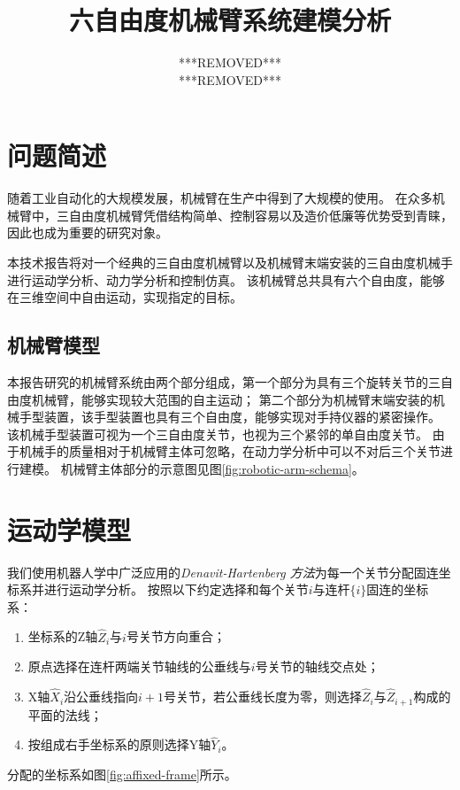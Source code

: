 \documentclass{ctexart}
\title{六自由度机械臂系统建模分析}
\author{***REMOVED*** \\ ***REMOVED***}
\begin{document}
\maketitle

\section{问题简述}

随着工业自动化的大规模发展，机械臂在生产中得到了大规模的使用。
在众多机械臂中，三自由度机械臂凭借结构简单、控制容易以及造价低廉等优势受到青睐，因此也成为重要的研究对象。

本技术报告将对一个经典的三自由度机械臂以及机械臂末端安装的三自由度机械手进行运动学分析、动力学分析和控制仿真。
该机械臂总共具有六个自由度，能够在三维空间中自由运动，实现指定的目标。

\subsection{机械臂模型}



本报告研究的机械臂系统由两个部分组成，第一个部分为具有三个旋转关节的三自由度机械臂，能够实现较大范围的自主运动；
第二个部分为机械臂末端安装的机械手型装置，该手型装置也具有三个自由度，能够实现对手持仪器的紧密操作。
该机械手型装置可视为一个三自由度关节，也视为三个紧邻的单自由度关节。
由于机械手的质量相对于机械臂主体可忽略，在动力学分析中可以不对后三个关节进行建模。
机械臂主体部分的示意图见图\ref{fig:robotic-arm-schema}。

\section{运动学模型}

我们使用机器人学中广泛应用的\emph{Denavit-Hartenberg 方法}为每一个关节分配固连坐标系并进行运动学分析。
按照以下约定选择和每个关节$i$与连杆$\{i\}$固连的坐标系：
\begin{enumerate}
    \item 坐标系的Z轴$\hat Z_i$与$i$号关节方向重合；
    \item 原点选择在连杆两端关节轴线的公垂线与$i$号关节的轴线交点处；
    \item X轴$\hat X_i$沿公垂线指向$i+1$号关节，若公垂线长度为零，则选择$\hat Z_i$与$\hat Z_{i+1}$构成的平面的法线；
    \item 按组成右手坐标系的原则选择Y轴$\hat Y_i$。
\end{enumerate}
分配的坐标系如图\ref{fig:affixed-frame}所示。
\end{document}
